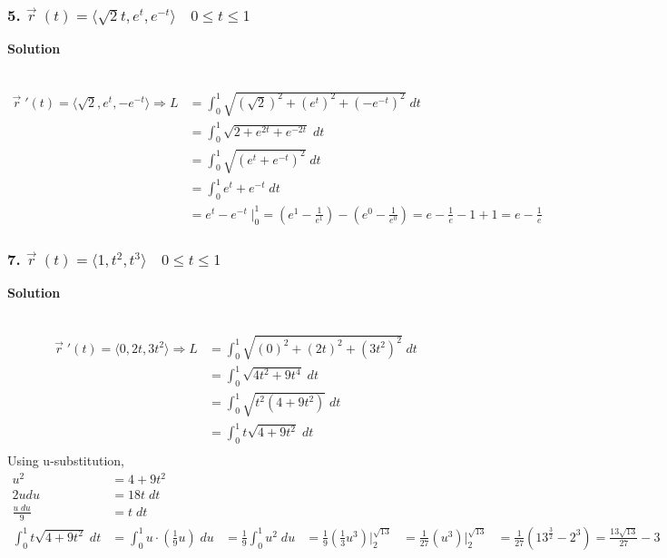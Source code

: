 \documentclass{article}
\begin{document}
\[
\]

\subsubsection*{5. $\vec{r}\;(t) = \langle{\sqrt{2}t, e^{t}, e^{-t}} \rangle \quad 0 \leq t \leq 1$}
\centerline{\textbf{Solution}} \\

\begin{align*}
    \vec{r}\; '(t) = \langle{\sqrt{2}, e^{t}, -e^{-t}} \rangle \Rightarrow
    L &= \int_{0}^{1} \sqrt{(\sqrt{2})^2 + (e^{t})^{2} + (-e^{-t})^{2}}\; dt \\
      &= \int_{0}^{1} \sqrt{2 + e^{2t} + e^{-2t}}\; dt \\ 
      &= \int_{0}^{1} \sqrt{(e^{t} + e^{-t})^2}\; dt \\
      &= \int_{0}^{1} e^{t} + e^{-t}\; dt \\
      &= e^{t} - e^{-t}\; \Big|_{0}^{1} = (e^{1} - \frac{1}{e^1}) - (e^{0} - \frac{1}{e^0}) = e - \frac{1}{e} - 1 + 1 = e - \frac{1}{e}
\end{align*}



\subsubsection*{7. $\vec{r}\;(t) = \langle{1, t^2, t^3} \rangle \quad 0 \leq t \leq 1$}
\centerline{\textbf{Solution}} \\

\begin{align*}
    \vec{r}\; '(t) = \langle{0, 2t, 3t^2} \rangle \Rightarrow
    L &= \int_{0}^{1} \sqrt{(0)^2 + (2t)^2 + (3t^2)^2}\; dt \\
      &= \int_{0}^{1} \sqrt{4t^2 + 9t^4}\; dt \\
      &= \int_{0}^{1} \sqrt{t^2(4 + 9t^2)}\; dt \\
      &= \int_{0}^{1} t\sqrt{4 + 9t^2}\; dt \\
\end{align*}
Using u-substitution,
\begin{align*}
    u^2 &= 4 + 9t^2 \\
    2udu &= 18t\; dt \\
    \frac{u\;du}{9} &= t\; dt \\
    \int_{0}^{1} t\sqrt{4 + 9t^2}\; dt
                    &= \int_{0}^{1} u \cdot(\frac{1}{9} u) \; du
                    &= \frac{1}{9} \int_{0}^{1} u^2\; du
                    &= \frac{1}{9} (\frac{1}{3} u^3) \Big|_{2}^{\sqrt{13}}
                    &= \frac{1}{27} (u^3) \Big|_{2}^{\sqrt{13}}
                    &= \frac{1}{27} (13^{\frac{3}{2}} - 2^3) = \frac{13\sqrt{13}}{27} - 3
\end{align*}
\end{document}
